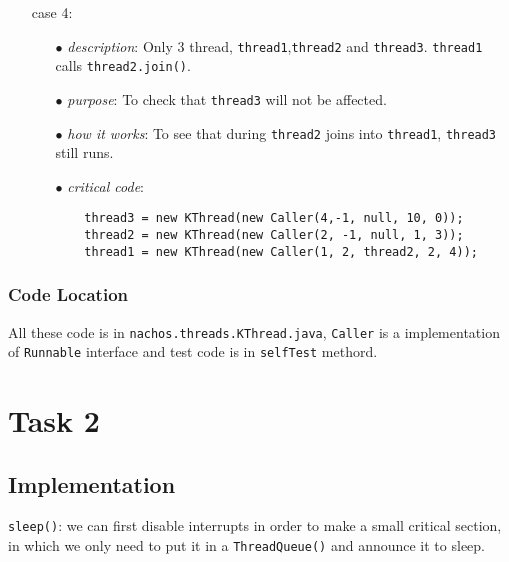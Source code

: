 \documentclass{article}
\begin{document}
\begin{spacing}{1.1}
\begin{enumerate}
\begin{enumerate}
	\texttt{thread3}. \texttt{thread1} calls \texttt{thread2.join()} while \texttt{thread2} calls \texttt{thread3.join()}.
      \item[$\bullet$] \textit{purpose}: To check whether mutiple \texttt{join}() work well.
      \item[$\bullet$] \textit{how it works}: \texttt{thread2} waits \texttt{thread3} and \texttt{thread1} waits \texttt{thread2}.
      \item[$\bullet$] \textit{critical code}:
	\begin{lstlisting}
	thread3 = new KThread(new Caller(3, -1, null, 7, 0));
	thread2 = new KThread(new Caller(2, 3, thread3, 1, 3));
	thread1 = new KThread(new Caller(1, 2, thread2, 4, 2));
        \end{lstlisting}
    \end{enumerate}
  \item[] case 4:
    \begin{enumerate}
      \item[$\bullet$] \textit{description}: Only 3 thread, \texttt{thread1},\texttt{thread2} and
	\texttt{thread3}. \texttt{thread1} calls \texttt{thread2.join()}.
      \item[$\bullet$] \textit{purpose}: To check that \texttt{thread3} will not be affected.
      \item[$\bullet$] \textit{how it works}: To see that during \texttt{thread2} joins into \texttt{thread1}, 
	\texttt{thread3} still runs.
      \item[$\bullet$] \textit{critical code}:
	\begin{lstlisting}
	thread3 = new KThread(new Caller(4,-1, null, 10, 0));
	thread2 = new KThread(new Caller(2, -1, null, 1, 3));
	thread1 = new KThread(new Caller(1, 2, thread2, 2, 4));	
        \end{lstlisting}
    \end{enumerate}
\end{enumerate}
\subsubsection{Code Location}
All these code is in \texttt{nachos.threads.KThread.java}, \texttt{Caller} is a implementation of \texttt{Runnable} 
interface and test code is in \texttt{selfTest} methord.
    \section{Task 2}
    \subsection{Implementation}
    \texttt{sleep()}: we can first disable interrupts in order to make a small critical section, in which we only need to put it in a \texttt{ThreadQueue()} and announce it to sleep.


\end{spacing}
\end{document}

